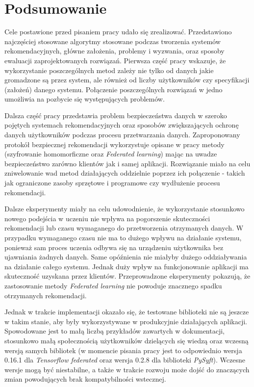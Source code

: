 
\chapter{Podsumowanie}

Cele postawione przed pisaniem pracy udało się zrealizować. Przedstawiono najczęściej stosowane algorytmy stosowane podczas tworzenia systemów rekomendacyjnych, główne założenia, problemy i wyzwania, oraz sposoby ewaluacji zaprojektowanych rozwiązań. Pierwsza część pracy wskazuje, że wykorzystanie poszczególnych metod zależy nie tylko od danych jakie gromadzone są przez system, ale również od liczby użytkowników czy specyfikacji (założeń) danego systemu. Połączenie poszczególnych rozwiązań w jedno umożliwia na pozbycie się występujących problemów.

Dalsza część pracy przedstawia problem bezpieczeństwa danych w szeroko pojętych systemach rekomendacyjnych oraz sposobów zwiększających ochronę danych użytkowników podczas procesu przetwarzania danych. Zaproponowany protokół bezpiecznej rekomendacji wykorzystuje opisane w pracy metody (szyfrowanie homomorficzne oraz \textit{Federated learning}) mając na uwadze bezpieczeństwo zarówno klientów jak i samej aplikacji. Rozwiązanie miało na celu zniwelowanie wad metod działających oddzielnie poprzez ich połączenie - takich jak ograniczone zasoby sprzętowe i programowe czy wydłużenie procesu rekomendacji.

Dalsze eksperymenty miały na celu udowodnienie, że wykorzystanie stosunkowo nowego podejścia w uczeniu nie wpływa na pogorszenie skuteczności rekomendacji lub czasu wymaganego do przetworzenia otrzymanych danych. W przypadku wymaganego czasu nie ma to dużego wpływu na działanie systemu, ponieważ sam proces uczenia odbywa się na urządzeniu użytkownika bez ujawniania żadnych danych. Same opóźnienia nie miałyby dużego oddziaływania na działanie całego systemu. Jednak duży wpływ na funkcjonowanie aplikacji ma skuteczność uzyskana przez klientów. Przeprowadzone eksperymenty pokazują, że zastosowanie metody \textit{Federated learning} nie powoduje znacznego spadku otrzymanych rekomendacji. 

Jednak w trakcie implementacji okazało się, że testowane biblioteki nie są jeszcze w takim stanie, aby były wykorzystywane w produkcyjnie działających aplikacji. Spowodowane jest to małą liczbą przykładów zawartych w dokumentacji, stosunkowo małą społecznością użytkowników dzielących się wiedzą oraz wczesną wersją samych bibliotek (w momencie pisania pracy jest to odpowiednio wersja 0.16.1 dla \textit{Tensorflow federated} oraz wersja 0.2.8 dla biblioteki \textit{PySyft}). Wczesne wersje mogą być niestabilne, a także w trakcie rozwoju może dojść do znaczących zmian powodujących brak kompatybilności wstecznej.

